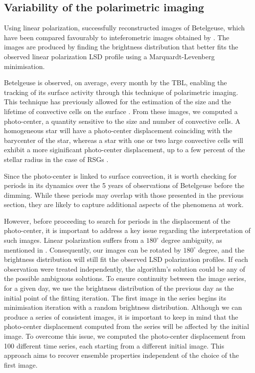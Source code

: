\documentclass{aa}
\begin{document}
\subsection{Variability of the polarimetric imaging}

Using linear polarization, \cite{lopez_ariste_convective_2018} successfully reconstructed images of Betelgeuse, which have been compared favourably to inteferometric images obtained by \cite{montarges_close_2016}. The images are produced by finding the brightness distribution that better fits the observed linear 
polarization LSD profile using a Marquardt-Levenberg minimisation.

Betelgeuse is observed, on average, every month by the TBL, enabling the tracking of its surface activity through this technique of polarimetric imaging. This technique has previously allowed for the estimation of  the size and the
 lifetime of convective cells on the surface \citep{lopez_ariste_convective_2018}. From these images, we computed a photo-center, a quantity sensitive to the size and number of convective cells. 
A homogeneous star will have a photo-center displacement coinciding with the barycenter of the star, whereas a star with one or two large convective cells will exhibit a more siginificant photo-center displacement, up to a few percent of the stellar radius in the case of RSGs \citep{chiavassa_probing_2022}. 

Since the photo-center is linked to surface convection, it is worth checking for periods in its 
dynamics over the 5 years of observations of Betelgeuse before the dimming. While these periods may overlap with those presented in the previous section, they are likely to capture additional aspects of the phenomena at work.

However, before proceeding to search for periods in the displacement of the photo-center, it is important to address a key issue regarding the interpretation of such images. 
Linear polarization suffers from a $180 ^\circ$ degree ambiguity, as mentioned in \cite{auriere_discovery_2016}. Consequently, our images 
can be 
rotated by $180^\circ$ degree, and the brightness distribution will still fit the observed LSD polarization profiles. 
If each observation were treated independently, the algorithm's solution could be any of the possible ambiguous solutions. To ensure continuity 
between the image series, 
for a given day, we use the brightness distribution of the previous day as the initial point 
of the  fitting iteration. The first image in the series begins its minimisation iteration with a random brightness distribution. 
Although we can produce a series of consistent images, it is important to keep in mind that the photo-center displacement computed from the series 
will be affected by the initial image. 
To overcome this issue, we computed
the photo-center displacement from 100 different time series, each starting from a different initial image. This approach aims to recover ensemble properties independent of the choice of the first image. 
\end{document}
